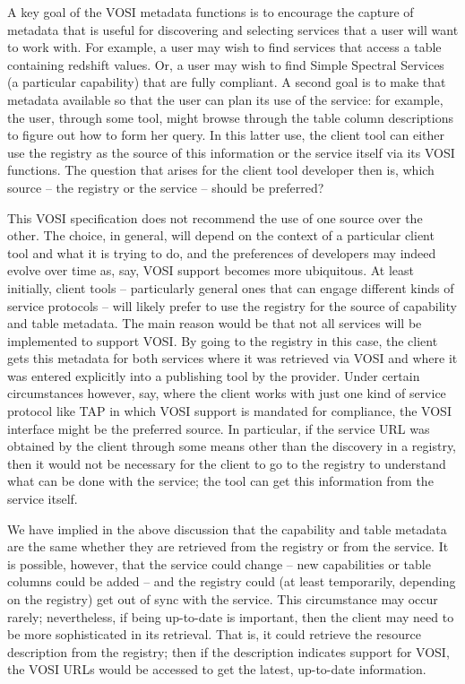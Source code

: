 \documentclass[11pt,letter]{ivoa}
\begin{document}
A key goal of the VOSI metadata functions is to encourage the capture of metadata that is useful for discovering and selecting services that a user will want to work with. For example, a user may wish to find services that access a table containing redshift values. Or, a user may wish to find Simple Spectral Services (a particular capability) that are fully compliant. A second goal is to make that metadata available so that the user can plan its use of the service: for example, the user, through some tool, might browse through the table column descriptions to figure out how to form her query. In this latter use, the client tool can either use the registry as the source of this information or the service itself via its VOSI functions. The question that arises for the client tool developer then is, which source -- the registry or the service -- should be preferred?

This VOSI specification does not recommend the use of one source over the other. The choice, in general, will depend on the context of a particular client tool and what it is trying to do, and the preferences of developers may indeed evolve over time as, say, VOSI support becomes more ubiquitous. At least initially, client tools -- particularly general ones that can engage different kinds of service protocols -- will likely prefer to use the registry for the source of capability and table metadata. The main reason would be that not all services will be implemented to support VOSI. By going to the registry in this case, the client gets this metadata for both services where it was retrieved via VOSI and where it was entered explicitly into a publishing tool by the provider. Under certain circumstances however, say, where the client works with just one kind of service protocol like TAP in which VOSI support is mandated for compliance, the VOSI interface might be the preferred source. In particular, if the service URL was obtained by the client through some means other than the discovery in a registry, then it would not be necessary for the client to go to the registry to understand what can be done with the service; the tool can get this information from the service itself. 

We have implied in the above discussion that the capability and table metadata are the same whether they are retrieved from the registry or from the service. It is possible, however, that the service could change -- new capabilities or table columns could be added -- and the registry could (at least temporarily, depending on the registry) get out of sync with the service. This circumstance may occur rarely; nevertheless, if being up-to-date is important, then the client may need to be more sophisticated in its retrieval. That is, it could retrieve the resource description from the registry; then if the description indicates support for VOSI, the VOSI URLs would be accessed to get the latest, up-to-date information. 
\end{document}
